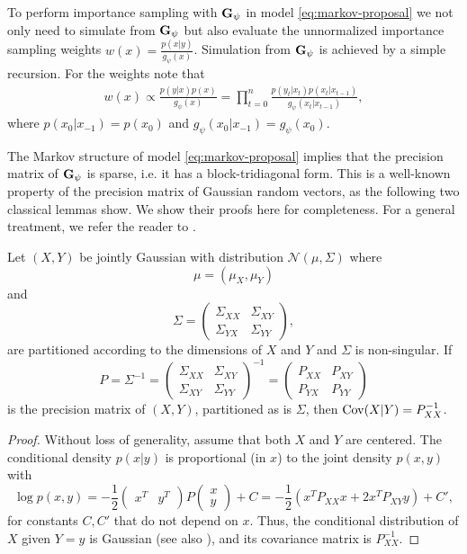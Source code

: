 To perform importance sampling with $\mathbf G_{\psi}$ in model \eqref{eq:markov-proposal} we not only need to simulate from $\mathbf G_{\psi}$ but also evaluate the unnormalized importance sampling weights $w(x) = \frac{p(x|y)}{g_{\psi}(x)}$. Simulation from $\mathbf G_{\psi}$ is achieved by a simple recursion. For the weights note that 
\begin{align}
\label{eq:weights_markov}
w(x) \propto \frac{p(y|x)p(x)}{g_{\psi}(x)} = \prod_{t = 0}^n \frac{p(y_{t}|x_{t})p(x_{t}|x_{t - 1})}{g_{\psi}(x_{t}|x_{t - 1})},
\end{align}
where $p(x_{0}|x_{-1}) = p(x_{0})$ and $g_{\psi}(x_{0}|x_{-1}) = g_{\psi}(x_{0})$.

The Markov structure of model \eqref{eq:markov-proposal} implies that the precision matrix of $\mathbf G_{\psi}$ is sparse, i.e. it has a block-tridiagonal form. This is a well-known property of the precision matrix of Gaussian random vectors, as the following two classical lemmas show. We show their proofs here for completeness. For a general treatment, we refer the reader to \citep[Chapters 3 and 5]{Lauritzen1996Graphical}.

\begin{lemma}
    \label{lem:gaussian_precision}
    Let $(X,Y)$ be jointly Gaussian with distribution $\mathcal N \left( \mu, \Sigma \right)$ where 
    $$
    \mu = \left(\mu_{X}, \mu_{Y}\right)
    $$
    and 
    $$
    \Sigma = \begin{pmatrix}
        \Sigma_{XX} & \Sigma_{XY} \\
        \Sigma_{YX} & \Sigma_{YY}
    \end{pmatrix},
    $$
    are partitioned according to the dimensions of $X$ and $Y$ and $\Sigma$ is non-singular.
    If $$P = \Sigma^{-1} = \begin{pmatrix} \Sigma_{XX} &  \Sigma_{XY} \\ \Sigma_{XY} & \Sigma_{YY} \end{pmatrix}^{-1}=  \begin{pmatrix} P_{XX} & P_{XY} \\ P_{YX} & P_{YY} \end{pmatrix}$$ 
    is the precision matrix of $(X,Y)$, partitioned as is $\Sigma$, then $\operatorname{Cov}(X|Y) = P_{XX}^{-1}$.
\end{lemma}
\begin{proof}
    Without loss of generality, assume that both $X$ and $Y$ are centered. 
    The conditional density $p(x|y)$ is proportional (in $x$) to the joint density $p(x,y)$ with 
    $$\log p(x,y) = -\frac 1 2 \begin{pmatrix} x^{T} & y^{T}\end{pmatrix}  P \begin{pmatrix} x\\y\end{pmatrix} + C = -\frac 12 \left(x^TP_{XX}x + 2x^TP_{XY}y\right) + C',$$
    for constants $C, C'$ that do not depend on $x$. 
    Thus, the conditional distribution of $X$ given $Y=y$ is Gaussian (see also ), and its covariance matrix is $P_{XX}^{-1}$.
\end{proof}

